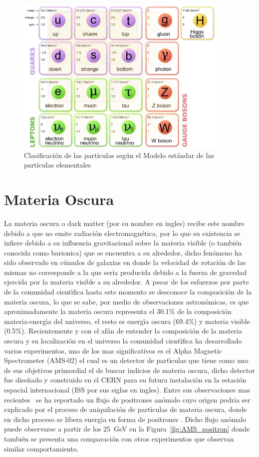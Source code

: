 \begin{figure}
\begin{center}
  \includegraphics[width=4.0in]{standard-model.png}
  \caption{Clasificaci\'on de las particulas seg\'un el Modelo est\'andar de las part\'iculas elementales}
  \label{fig:ME}
\end{center}
\end{figure}


\section{Materia Oscura}

La materia oscura o dark matter (por su nombre en ingles) recibe este nombre debido a que no emite radiaci\'on electromagn\'etica, por lo que su existencia se infiere debido a su influencia gravitacional sobre la materia visible (o tambi\'en conocida como barionica) que se encuentra a su alrededor, dicho fen\'omeno ha sido observado en c\'umulos de galaxias en donde la velocidad de rotaci\'on de las mismas no corresponde a la que seria producida debido a la fuerza de gravedad ejercida por la materia visible a su alrededor. A pesar de los esfuerzos por parte de la comunidad cient\'{\i}fica hasta este momento se desconoce la composici\'on de la materia oscura, lo que se sabe, por medio de observaciones astron\'omicas, es que aproximadamente la materia oscura representa el 30.1\%  de la composici\'on materia-energ\'{\i}a del universo, el resto es energ\'{\i}a oscura (69.4\%) y materia visible (0.5\%). Recientemente y con el af\'an de entender la composici\'on de la materia oscura y su localizaci\'on en el universo la comunidad cient\'{\i}fica ha desarrollado varios experimentos, uno de los mas significativos es el Alpha Magnetic Spectrometer (AMS-02) el cual es un detector de part\'{\i}culas que tiene como uno de sus objetivos primordial el de buscar indicios de materia oscura, dicho detector fue dise\~nado y construido en el CERN para su futura instalaci\'on en la estaci\'on espacial internacional (ISS por sus siglas en ingles). Entre sus observaciones mas recientes~\cite{ams:cern} se ha reportado un flujo de positrones an\'omalo cuyo origen podria ser explicado por el proceso de aniquilaci\'on de part\'{\i}culas de materia oscura, donde en dicho proceso se libera energ\'{\i}a en forma de positrones .  Dicho flujo an\'omalo puede observarse a partir de los 25~GeV en la Figura~\ref{fig:AMS_positron} donde tambi\'en se presenta una comparaci\'on con otros experimentos que observan similar comportamiento.


